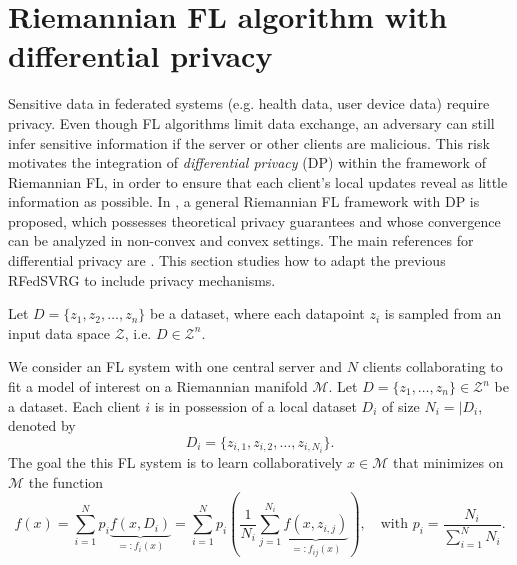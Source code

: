 \documentclass[10pt,a4paper]{book}
\theoremstyle{definition}
\theoremstyle{plain}
\theoremstyle{remark}
\newcommand \M {\mathcal{M}}
\begin{document}
\section{Riemannian FL algorithm with differential privacy} Sensitive data in federated systems (e.g. health data, user device data) require privacy. Even though FL algorithms limit data exchange, an adversary can still infer sensitive information if the server or other clients are malicious. This risk motivates the integration of \emph{differential privacy} (DP) within the framework of Riemannian FL, in order to ensure that each client's local updates reveal as little information as possible.
In \cite{huang2024federated}, a general Riemannian FL framework with DP is proposed, which possesses theoretical privacy guarantees and whose convergence can be analyzed in non-convex and convex settings. 
The main references for differential privacy are \cite{dwork2010boosting,kairouz2015composition}. 
This section studies how to adapt the previous RFedSVRG to include privacy mechanisms.
\par \medskip
Let $D=\{z_1,z_2,\dots, z_n\}$ be a dataset, where each datapoint $z_i$ is sampled from an input data space $\mathcal{Z}$, i.e. $D\in \mathcal{Z}^{n}$. 


We consider an FL system with one central server and $N$ clients collaborating to fit a model of interest on a Riemannian manifold $\M$. Let $D=\{z_1,\dots, z_n\}\in \mathcal{Z}^{n}$ be a dataset.
Each client $i$ is in possession of a local dataset $D_i$ of size $N_i=|D_i$, denoted by
$$D_i=\{z_{i,1},z_{i,2},\dots, z_{i,N_i}\}.$$
The goal the this FL system is to learn collaboratively $x\in \M$ that minimizes on $\M$ the function
$$f(x)=\sum_{i=1}^{N}p_i\underbrace{f(x,D_i)}_{=:f_i(x)}=\sum_{i=1}^{N}p_i\left(\frac{1}{N_i}\sum_{j=1}^{N_i}\underbrace{f(x,z_{i,j})}_{=:f_{ij}(x)}\right),\quad \text{with } p_i=\frac{N_i}{\sum_{i=1}^{N}N_i}.$$
\end{document}
